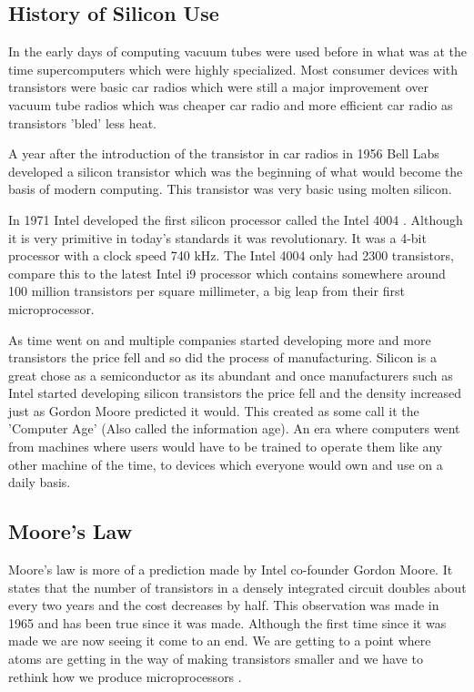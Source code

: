 \documentclass[journal]{IEEEtran}
\begin{document}
\subsection{History of Silicon Use}
In the early days of computing vacuum tubes \cite{8931727020180101} were used before in what was at the time supercomputers which were highly specialized. Most consumer devices with transistors were basic car radios which were still a major improvement over vacuum tube radios which was cheaper car radio and more efficient car radio as transistors 'bled' less heat.

A year after the introduction of the transistor in car radios in 1956 Bell Labs \cite{8896076320180101} developed a silicon transistor which was the beginning of what would become the basis of modern computing. This transistor was very basic using molten silicon.

In 1971 Intel developed the first silicon processor called the Intel 4004 \cite{8732145520170101}. Although it is very primitive in today's standards it was revolutionary. It was a 4-bit processor with a clock speed 740 kHz. The Intel 4004 only had 2300 transistors, compare this to the latest Intel i9 processor which contains somewhere around 100 million transistors per square millimeter, a big leap from their first microprocessor. 

As time went on and multiple companies started developing more and more transistors the price fell and so did the process of manufacturing. Silicon is a great chose as a semiconductor as its abundant and once manufacturers such as Intel started developing silicon transistors the price fell and the density increased just as Gordon Moore predicted it would. This created as some call it the 'Computer Age' (Also called the information age). An era where computers went from machines where users would have to be trained to operate them like any other machine of the time, to devices which everyone would own and use on a daily basis.

\subsection{Moore's Law}
Moore's law \cite{12560013020170101} is more of a prediction made by Intel co-founder Gordon Moore. It states that the number of transistors in a densely integrated circuit doubles about every two years and the cost decreases by half. This observation was made in 1965 and has been true since it was made. Although the first time since it was made we are now seeing it come to an end. We are getting to a point where atoms are getting in the way of making transistors smaller and we have to rethink how we produce microprocessors \cite{591665} \cite{12896637520180324}.
\end{document}
